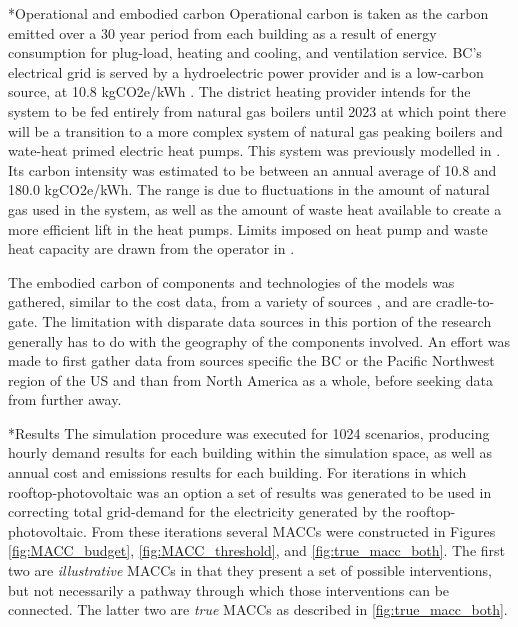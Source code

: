 \documentclass[twocolumn, a4paper,10pt]{article}
\makeatletter
\renewcommand\section{\@startsection{section}{1}{\z@}{3pt}{3pt}{\normalfont\large\bfseries}}
\renewcommand\subsection{\@startsection{subsection}{1}{\z@}{\z@}{\z@}{\normalfont\normalsize\bfseries}}
\renewcommand\subsection{\@startsection{subsection}{1}{\z@}{\z@}{0.1pt}{\normalfont\normalsize\bfseries}}
\makeatother
\begin{document}
\subsection*{Operational and embodied carbon}
Operational carbon is taken as the carbon emitted over a 30 year period from each building as a result of energy consumption for plug-load, heating and cooling, and ventilation service. BC's electrical grid is served by a hydroelectric power provider and is a low-carbon source, at 10.8 kgCO2e/kWh \citep{bc_ministry_of_envrionmetn_and_climate_change_strategy_bc_2019}. The district heating provider intends for the system to be fed entirely from natural gas boilers until 2023 at which point there will be a transition to a more complex system of natural gas peaking boilers and wate-heat primed electric heat pumps. This system was previously modelled in \citet{mccarty_accepted_2020}. Its carbon intensity was estimated to be between an annual average of 10.8 and 180.0 kgCO2e/kWh. The range is due to fluctuations in the amount of natural gas used in the system, as well as the amount of waste heat available to create a more efficient lift in the heat pumps. Limits imposed on heat pump and waste heat capacity are drawn from the operator in \citet{noauthor_infrastructure_2014}.

The embodied carbon of components and technologies of the models was gathered, similar to the cost data, from a variety of sources \citep{jones_ice_2019, droguett_embodied_2019,c-change_labs_embodied_2020}, and are cradle-to-gate. The limitation with disparate data sources in this portion of the research generally has to do with the geography of the components involved. An effort was made to first gather data from sources specific the BC or the Pacific Northwest region of the US and than from North America as a whole, before seeking data from further away. 

\section*{Results}
The simulation procedure was executed for 1024 scenarios, producing hourly demand results for each building within the simulation space, as well as annual cost and emissions results for each building. For iterations in which rooftop-photovoltaic was an option a set of results was generated to be used in correcting total grid-demand for the electricity generated by the rooftop-photovoltaic. From these iterations several MACCs were constructed in Figures \ref{fig:MACC_budget}, \ref{fig:MACC_threshold}, and \ref{fig:true_macc_both}. The first two are \textit{illustrative} MACCs in that they present a set of possible interventions, but not necessarily a pathway through which those interventions can be connected. The latter two are \textit{true} MACCs as described in \ref{fig:true_macc_both}.
\end{document}
